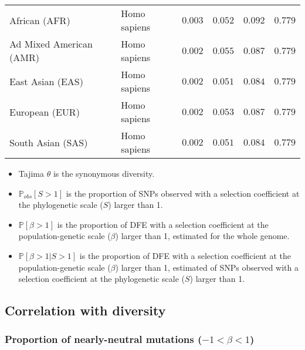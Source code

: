 \documentclass{article}
\newcommand{\proba}{\mathbb{P}}
\newcommand{\Sphy}{S}
\newcommand{\divAdv}{ \Sphy > 1}
\newcommand{\Spop}{\beta}
\newcommand{\polyNeutral}{-1 < \Spop < 1}
\newcommand{\polyAdv}{ \Spop > 1}
\newcommand{\PpolyAdv}{\proba \left[ \polyAdv \right]}
\begin{document}
\begin{center}
\begin{longtable}{|l|l|r|r|r|r|}
            African (AFR)                  & Homo sapiens        & $ 0.003$        & $ 0.052$                & $ 0.092$    & $ 0.779$                       \\
            Ad Mixed American (AMR)        & Homo sapiens        & $ 0.002$        & $ 0.055$                & $ 0.087$    & $ 0.779$                       \\
            East Asian (EAS)               & Homo sapiens        & $ 0.002$        & $ 0.051$                & $ 0.084$    & $ 0.779$                       \\
            European (EUR)                 & Homo sapiens        & $ 0.002$        & $ 0.053$                & $ 0.087$    & $ 0.779$                       \\
            South Asian (SAS)              & Homo sapiens        & $ 0.002$        & $ 0.051$                & $ 0.084$    & $ 0.779$                       \\
        \end{longtable}
    \end{center}
    \begin{itemize}
        \item Tajima $\theta$ is the synonymous diversity.
        \item $\proba_{obs}[\divAdv]$ is the proportion of SNPs observed with a selection coefficient at the phylogenetic scale ($\Sphy$) larger than 1.
        \item $\PpolyAdv $ is the proportion of DFE with a selection coefficient at the population-genetic scale ($\Spop$) larger than 1, estimated for the whole genome.
        \item $\proba [ \polyAdv | \divAdv]$ is the proportion of DFE with a selection coefficient at the population-genetic scale ($\Spop$) larger than 1, estimated of SNPs observed with a selection coefficient at the phylogenetic scale ($\Sphy$) larger than 1.
    \end{itemize}

    \subsection{Correlation with diversity}

    \subsubsection{Proportion of nearly-neutral mutations ($\polyNeutral$)}
\end{document}
